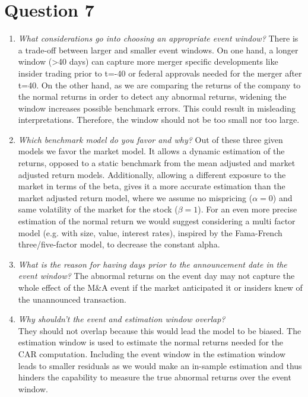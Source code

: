 \section{Question 7}
\begin{enumerate}[label=\alph*),leftmargin=*]

\item \textit{What considerations go into choosing an appropriate event window?} \newline
There is a trade-off between larger and smaller event windows. On one hand, a longer window (>40 days) can capture more merger specific developments like insider trading prior to t=-40 or federal approvals needed for the merger after t=40. On the other hand, as we are comparing the returns of the company to the normal returns in order to detect any abnormal returns, widening the window increases possible benchmark errors. This could result in misleading interpretations. Therefore, the window should not be too small nor too large.
\item \textit{Which benchmark model do you favor and why?}\newline
Out of these three given models we favor the market model. It allows a dynamic estimation of the returns, opposed to a static benchmark from the mean adjusted and market adjusted return models. Additionally, allowing a different exposure to the market in terms of the beta, gives it a more accurate estimation than the market adjusted return model, where we assume no mispricing ($\alpha= 0$) and same volatility of the market for the stock ($\beta= 1$). For an even more precise estimation of the normal return we would suggest considering a multi factor model (e.g. with size, value, interest rates), inspired by the Fama-French three/five-factor model, to decrease the constant alpha.
\item \textit{What is the reason for having days prior to the announcement date in the event window?}\newline
The abnormal returns on the event day may not capture the whole effect of the M\&A event if the market anticipated it or insiders knew of the unannounced transaction.
\item \textit{Why shouldn’t the event and estimation window overlap?}\\
They should not overlap because this would lead the model to be biased. The estimation window is used to estimate the normal returns needed for the CAR computation. Including the event window in the estimation window leads to smaller residuals as we would make an in-sample estimation and thus hinders the capability to measure the true abnormal returns over the event window.\cite{Hardouvelis1987}

\end{enumerate}



